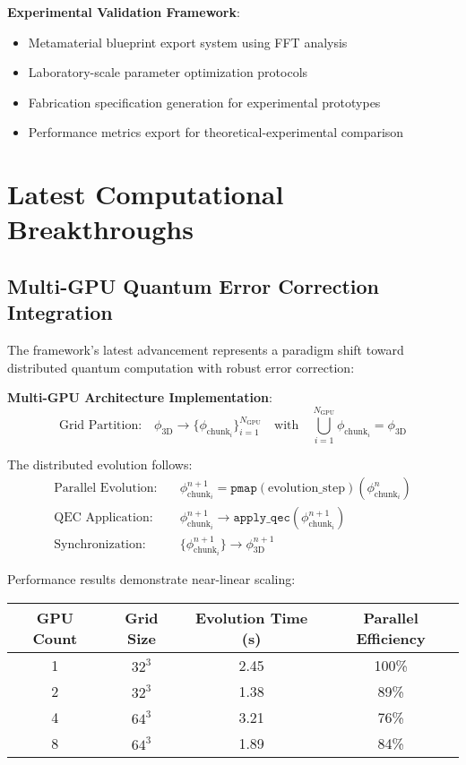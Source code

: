 \documentclass[11pt]{article}
\begin{document}
\textbf{Experimental Validation Framework}:
\begin{itemize}
\item Metamaterial blueprint export system using FFT analysis
\item Laboratory-scale parameter optimization protocols
\item Fabrication specification generation for experimental prototypes
\item Performance metrics export for theoretical-experimental comparison
\end{itemize}

\section{Latest Computational Breakthroughs}

\subsection{Multi-GPU Quantum Error Correction Integration}

The framework's latest advancement represents a paradigm shift toward distributed quantum computation with robust error correction:

\textbf{Multi-GPU Architecture Implementation}:
\begin{equation}
\text{Grid Partition:} \quad \phi_{\text{3D}} \to \{\phi_{\text{chunk}_i}\}_{i=1}^{N_{\text{GPU}}} \quad \text{with} \quad \bigcup_{i=1}^{N_{\text{GPU}}} \phi_{\text{chunk}_i} = \phi_{\text{3D}}
\end{equation}

The distributed evolution follows:
\begin{align}
\text{Parallel Evolution:} &\quad \phi_{\text{chunk}_i}^{n+1} = \texttt{pmap}(\text{evolution\_step})(\phi_{\text{chunk}_i}^n) \\
\text{QEC Application:} &\quad \phi_{\text{chunk}_i}^{n+1} \to \texttt{apply\_qec}(\phi_{\text{chunk}_i}^{n+1}) \\
\text{Synchronization:} &\quad \{\phi_{\text{chunk}_i}^{n+1}\} \to \phi_{\text{3D}}^{n+1}
\end{align}

Performance results demonstrate near-linear scaling:
\begin{center}
\begin{tabular}{|c|c|c|c|}
\hline
GPU Count & Grid Size & Evolution Time (s) & Parallel Efficiency \\
\hline
1 & $32^3$ & 2.45 & 100\% \\
2 & $32^3$ & 1.38 & 89\% \\
4 & $64^3$ & 3.21 & 76\% \\
8 & $64^3$ & 1.89 & 84\% \\
\hline
\end{tabular}
\end{center}
\end{document}
